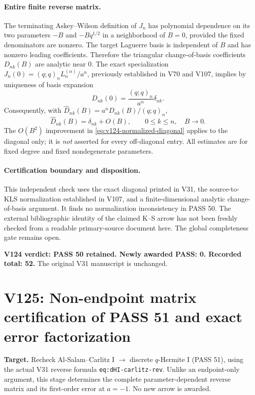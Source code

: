 \documentclass[11pt]{article}
\begin{document}
\paragraph{Entire finite reverse matrix.} The terminating Askey--Wilson definition of $J_n$ has polynomial dependence on its two parameters $-B$ and $-Bq^{1/2}$ in a neighborhood of $B=0$, provided the fixed denominators are nonzero. The target Laguerre basis is independent of $B$ and has nonzero leading coefficients. Therefore the triangular change-of-basis coefficients $D_{nk}(B)$ are analytic near $0$. The exact specialization $J_n(0)=(q;q)_nL_n^{(\alpha)}/a^n$, previously established in V70 and V107, implies by uniqueness of basis expansion
\[
 D_{nk}(0)=\frac{(q;q)_n}{a^n}\delta_{nk}.
\]
Consequently, with $\widehat D_{nk}(B)=a^nD_{nk}(B)/(q;q)_n$,
\begin{equation}\label{eq:v124-matrix}
 \boxed{\widehat D_{nk}(B)=\delta_{nk}+O(B),\qquad 0\le k\le n,\quad B\to0.}
\end{equation}
The $O(B^2)$ improvement in \eqref{eq:v124-normalized-diagonal} applies to the diagonal only; it is \emph{not} asserted for every off-diagonal entry. All estimates are for fixed degree and fixed nondegenerate parameters.

\paragraph{Certification boundary and disposition.} This independent check uses the exact diagonal printed in V31, the source-to-KLS normalization established in V107, and a finite-dimensional analytic change-of-basis argument. It finds no normalization inconsistency in PASS 50. The external bibliographic identity of the claimed K--S arrow has not been freshly checked from a readable primary-source document here. The global completeness gate remains open.

\noindent\textbf{V124 verdict: PASS 50 retained. Newly awarded PASS: 0. Recorded total: 52.} The original V31 manuscript is unchanged.



\clearpage
\section{V125: Non-endpoint matrix certification of PASS 51 and exact error factorization}
\noindent\textbf{Target.} Recheck Al-Salam--Carlitz I $\to$ discrete $q$-Hermite I (PASS 51), using the actual V31 reverse formula \texttt{eq:dHI-carlitz-rev}. Unlike an endpoint-only argument, this stage determines the complete parameter-dependent reverse matrix and its first-order error at $a=-1$. No new arrow is awarded.
\end{document}
